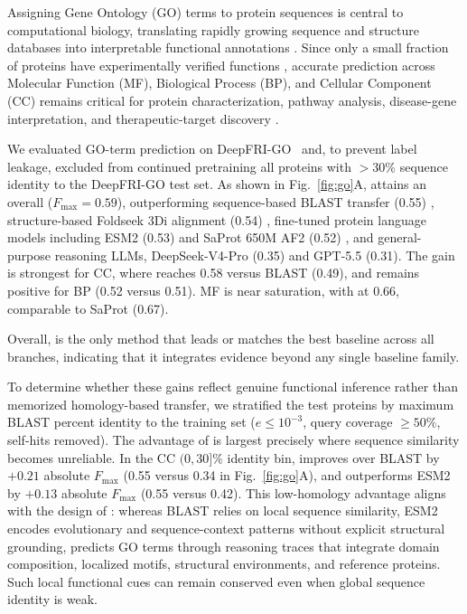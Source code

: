 Assigning Gene Ontology (GO) terms \citep{ashburner2000go,gene2021gene} to protein sequences is central to computational biology, translating rapidly growing sequence and structure databases \citep{abramson2024accurate} into interpretable functional annotations \citep{uniprot2023uniprot}. Since only a small fraction of proteins have experimentally verified functions \citep{friedberg2006automated,radivojac2013large}, accurate prediction across Molecular Function (MF), Biological Process (BP), and Cellular Component (CC) remains critical for protein characterization, pathway analysis, disease-gene interpretation, and therapeutic-target discovery \citep{cantalapiedra2021eggnog,gligorijevic2021deepfri}. 
 

We evaluated GO-term prediction on DeepFRI-GO~\citep{gligorijevic2021deepfri} and, to prevent label leakage, excluded from continued pretraining all proteins with $>$30\% sequence identity to the DeepFRI-GO test set. 
As shown in Fig.~\ref{fig:go}A, \projName{} attains an overall ($F_{\max}=0.59$), outperforming sequence-based BLAST transfer (0.55) \citep{altschul1990blast}, structure-based Foldseek 3Di alignment (0.54) \citep{van2024fast}, fine-tuned protein language models including ESM2 (0.53) \citep{esm2} and SaProt 650M AF2 (0.52) \citep{su2025saprothub}, and general-purpose reasoning LLMs, DeepSeek-V4-Pro (0.35) and GPT-5.5 (0.31). The gain is strongest for CC, where \projName{} reaches 0.58 versus BLAST (0.49), and remains positive for BP (0.52 versus 0.51). MF is near saturation, with \projName{} at 0.66, comparable to SaProt (0.67). 
 
Overall, \projName{} is the only method that leads or matches the best baseline across all branches, indicating that it integrates evidence beyond any single baseline family.


To determine whether these gains reflect genuine functional inference rather than memorized homology-based transfer, we stratified the test proteins by maximum BLAST percent identity to the training set (\(e\leq10^{-3}\), query coverage \(\geq50\%\), self-hits removed). The advantage of \projName{} is largest precisely where sequence similarity becomes unreliable. 
In the CC \((0,30]\%\) identity bin, \projName{} improves over BLAST by \(+0.21\) absolute \(F_{\max}\) (0.55 versus 0.34 in Fig.~\ref{fig:go}A), and outperforms ESM2 by \(+0.13\) absolute \(F_{\max}\) (0.55 versus 0.42). 
This low-homology advantage aligns with the design of \projName{}: whereas BLAST relies on local sequence similarity, ESM2 encodes evolutionary and sequence-context patterns without explicit structural grounding, \projName{} predicts GO terms through reasoning traces that integrate domain composition, localized motifs, structural environments, and reference proteins. Such local functional cues can remain conserved even when global sequence identity is weak. 


